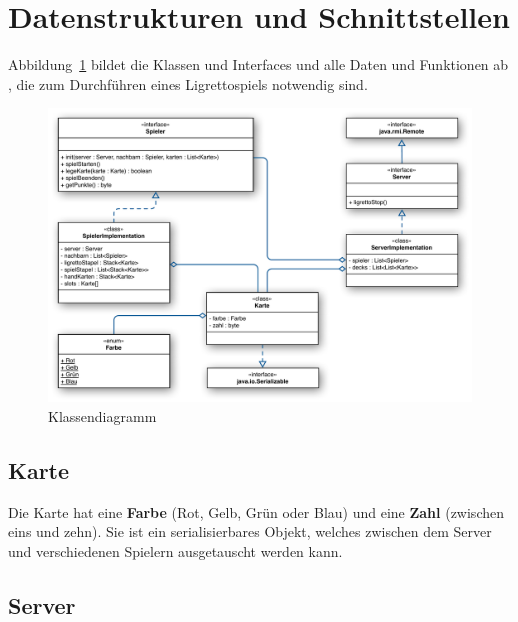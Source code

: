 \section{Datenstrukturen und Schnittstellen} 

Abbildung~\ref{Klassendiagramm} bildet die Klassen und Interfaces und alle Daten und Funktionen ab , die zum Durchführen eines Ligrettospiels notwendig sind.



\begin{figure}[H]
	\includegraphics[width=1.0\textwidth,angle=0]{graphics/klassendiagramm.pdf}
	\caption{Klassendiagramm \hfill{} }
	\label{Klassendiagramm}
\end{figure}

\newpage

\subsection{Karte}

Die Karte hat eine {\bf Farbe} (Rot, Gelb, Grün oder Blau) und eine {\bf Zahl} (zwischen eins und zehn). Sie ist ein serialisierbares Objekt, welches zwischen dem Server und verschiedenen Spielern ausgetauscht werden kann.



\newpage

\subsection{Server}

